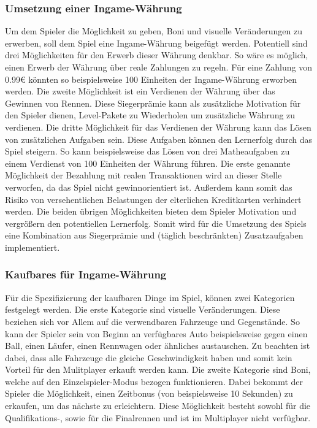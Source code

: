 	\subsubsection{Umsetzung einer Ingame-Währung}
	Um dem Spieler die Möglichkeit zu geben, Boni und visuelle Veränderungen zu erwerben, soll dem Spiel eine Ingame-Währung beigefügt werden. Potentiell sind drei Möglichkeiten für den Erwerb dieser Währung denkbar. So wäre es möglich, einen Erwerb der Währung über reale Zahlungen zu regeln. Für eine Zahlung von 0.99€ könnten so beispielsweise 100 Einheiten der Ingame-Währung erworben werden. Die zweite Möglichkeit ist ein Verdienen der Währung über das Gewinnen von Rennen. Diese Siegerprämie kann als zusätzliche Motivation für den Spieler dienen, Level-Pakete zu Wiederholen um zusätzliche Währung zu verdienen. Die dritte Möglichkeit für das Verdienen der Währung kann das Lösen von zusätzlichen Aufgaben sein. Diese Aufgaben können den Lernerfolg durch das Spiel steigern. So kann beispielsweise das Lösen von drei Matheaufgaben zu einem Verdienst von 100 Einheiten der Währung führen.
	Die erste genannte Möglichkeit der Bezahlung mit realen Transaktionen wird an dieser Stelle verworfen, da das Spiel nicht gewinnorientiert ist. Außerdem kann somit das Risiko von versehentlichen Belastungen der elterlichen Kreditkarten verhindert werden.
	Die beiden übrigen Möglichkeiten bieten dem Spieler Motivation und vergrößern den potentiellen Lernerfolg. Somit wird für die Umsetzung des Spiels eine Kombination aus Siegerprämie und (täglich beschränkten) Zusatzaufgaben implementiert.

	\subsubsection{Kaufbares für Ingame-Währung}
	Für die Spezifizierung der kaufbaren Dinge im Spiel, können zwei Kategorien festgelegt werden. Die erste Kategorie sind visuelle Veränderungen. Diese beziehen sich vor Allem auf die verwendbaren Fahrzeuge und Gegenstände. So kann der Spieler sein von Beginn an verfügbares Auto beispielsweise gegen einen Ball, einen Läufer, einen Rennwagen oder ähnliches austauschen. Zu beachten ist dabei, dass alle Fahrzeuge die gleiche Geschwindigkeit haben und somit kein Vorteil für den Mulitplayer erkauft werden kann. Die zweite Kategorie sind Boni, welche auf den Einzelspieler-Modus bezogen funktionieren. Dabei bekommt der Spieler die Möglichkeit, einen Zeitbonus (von beispielsweise 10 Sekunden) zu erkaufen, um das nächste zu erleichtern. Diese Möglichkeit besteht sowohl für die Qualifikations-, sowie für die Finalrennen und ist im Multiplayer nicht verfügbar.


